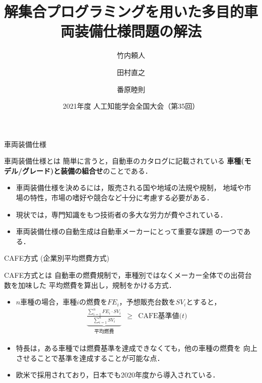 \documentclass[dvipdfmx, 11pt]{beamer}
\title{解集合プログラミングを用いた多目的車両装備仕様問題の解法}
\author{竹内頼人\inst{1} \and 田村直之\inst{2} \and 番原睦則\inst{1}}
\institute{\inst{1}名古屋大学 大学院情報学研究科 \and \inst{2}神戸大学 情報基盤センター}
\date{2021年度 人工知能学会全国大会（第35回）}
\begin{document}
\frame{\titlepage}
\begin{frame}{車両装備仕様}
  \begin{alertblock}{車両装備仕様とは}
    簡単に言うと，自動車のカタログに記載されている
    \textbf{車種(モデル/グレード)と装備の組合せ}のことである．
  \end{alertblock}

  \begin{itemize}
  \item 車両装備仕様を決めるには，販売される国や地域の法規や規制，
	地域や市場の特性，市場の嗜好や競合など十分に考慮する必要がある．
  \item 現状では，専門知識をもつ技術者の多大な労力が費やされている．
  \item 車両装備仕様の自動生成は自動車メーカーにとって重要な課題
	の一つである．
  \end{itemize}

\end{frame}
\begin{frame}{CAFE方式 (企業別平均燃費方式)}
 \begin{alertblock}{CAFE方式とは}
  自動車の燃費規制で，車種別ではなくメーカー全体での出荷台数を加味した
  平均燃費を算出し，規制をかける方式．
 \end{alertblock}
 \begin{itemize}
  \item $n$車種の場合，車種$i$の燃費を$FE_i$，予想販売台数を$SV_i$とすると，
    \[
      \begin{array}{lcr}
        \underbrace{
        \frac{\sum_{i=1}^{n} FE_{i}\cdot SV_{i}}
        {\sum_{i=1}^{n} SV_{i}}}_{\textrm{平均燃費}
        }
        &
        \geq 
        &
        \textrm{CAFE基準値($t$)}
      \end{array}
    \]
  \item 特長は，ある車種では燃費基準を達成できなくても，他の車種の燃費を
    向上させることで基準を達成することが可能な点．
  \item 欧米で採用されており，日本でも2020年度から導入されている．
 \end{itemize}
\end{frame}
\end{document}
